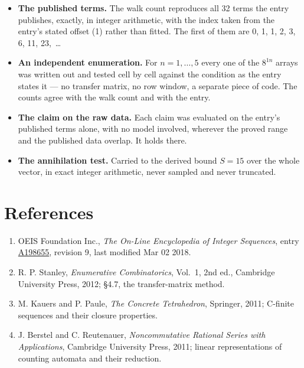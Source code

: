 \documentclass[11pt]{article}
\theoremstyle{definition}
\begin{document}
\begin{itemize}

\item {\bfseries The published terms.} The walk count reproduces all 32 terms the entry publishes, exactly, in integer arithmetic, with the index taken from the entry's stated offset (1) rather than fitted. The first of them are 0, 1, 1, 2, 3, 6, 11, 23,~\dots

\item {\bfseries An independent enumeration.} For $n = 1,\dots,5$ every one of the $8^{1n}$ arrays was written out and tested cell by cell against the condition as the entry states it --- no transfer matrix, no row window, a separate piece of code. The counts agree with the walk count and with the entry.

\item {\bfseries The claim on the raw data.} Each claim was evaluated on the entry's published terms alone, with no model involved, wherever the proved range and the published data overlap. It holds there.

\item {\bfseries The annihilation test.} Carried to the derived bound $S = 15$ over the whole vector, in exact integer arithmetic, never sampled and never truncated.

\end{itemize}

\section{References}

\begin{enumerate}

\item OEIS Foundation Inc., \emph{The On-Line Encyclopedia of Integer Sequences}, entry \href{https://oeis.org/A198655}{A198655}, revision 9, last modified Mar 02 2018.

\item R. P. Stanley, \emph{Enumerative Combinatorics}, Vol.~1, 2nd ed., Cambridge University Press, 2012; \S4.7, the transfer-matrix method.

\item M. Kauers and P. Paule, \emph{The Concrete Tetrahedron}, Springer, 2011; C-finite sequences and their closure properties.

\item J. Berstel and C. Reutenauer, \emph{Noncommutative Rational Series with Applications}, Cambridge University Press, 2011; linear representations of counting automata and their reduction.

\end{enumerate}
\end{document}
